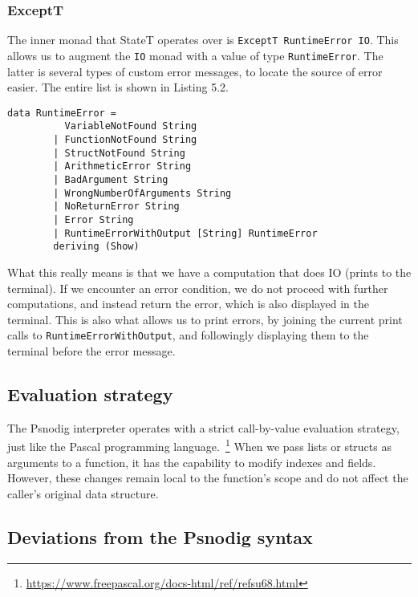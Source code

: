 \subsubsection{ExceptT}

The inner monad that StateT operates over is \texttt{ExceptT RuntimeError IO}. This allows us to augment the \texttt{IO} monad with a value of type \texttt{RuntimeError}. The latter is several types of custom error messages, to locate the source of error easier. The entire list is shown in Listing 5.2. \hfill \\

\begin{lstlisting}[caption={All error messages to be encountered in Psnodig}, captionpos=b, frame=trbl]
    data RuntimeError =
          VariableNotFound String
        | FunctionNotFound String
        | StructNotFound String
        | ArithmeticError String
        | BadArgument String
        | WrongNumberOfArguments String
        | NoReturnError String
        | Error String
        | RuntimeErrorWithOutput [String] RuntimeError
        deriving (Show)
\end{lstlisting}


What this really means is that we have a computation that does IO (prints to the terminal). If we encounter an error condition, we do not proceed with further computations, and instead return the error, which is also displayed in the terminal. This is also what allows us to print errors, by joining the current print calls to \texttt{RuntimeErrorWithOutput}, and followingly displaying them to the terminal before the error message.

\subsection{Evaluation strategy}

The Psnodig interpreter operates with a strict call-by-value evaluation strategy, just like the Pascal programming language.~\footnote{\url{https://www.freepascal.org/docs-html/ref/refsu68.html}} When we pass lists or structs as arguments to a function, it has the capability to modify indexes and fields. However, these changes remain local to the function's scope and do not affect the caller's original data structure.

\subsection{Deviations from the Psnodig syntax}

